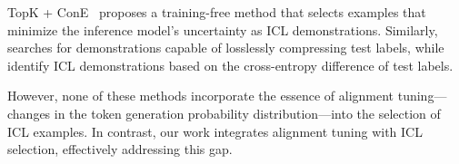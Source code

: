 TopK + ConE~\citep{peng2024revisiting} proposes a training-free method that selects examples that minimize the inference model’s uncertainty as ICL demonstrations. Similarly, \citet{wu2023self} searches for demonstrations capable of losslessly compressing test labels, while \citet{iter2023context} identify ICL demonstrations based on the cross-entropy difference of test labels.

However, none of these methods incorporate the essence of alignment tuning—changes in the token generation probability distribution—into the selection of ICL examples. In contrast, our work integrates alignment tuning with ICL selection, effectively addressing this gap.